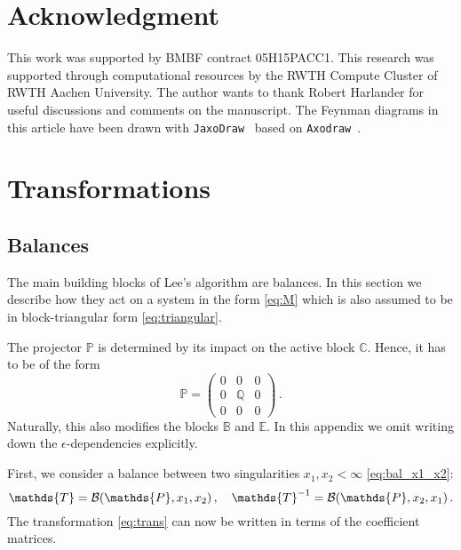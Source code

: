 \documentclass[12pt]{article}
\numberwithin{equation}{section}
\numberwithin{figure}{section}
\newcommand{\B}{\mathds{B}}
\newcommand{\C}{\mathds{C}}
\newcommand{\E}{\mathds{E}}
\newcommand{\T}{\mathds{T}}
\renewcommand{\P}{\mathds{P}}
\newcommand{\Q}{\mathds{Q}}
\begin{document}
  \section*{Acknowledgment}
    This work was supported by BMBF contract 05H15PACC1.
    This research was supported through computational resources by the RWTH Compute Cluster of RWTH Aachen University.
    The author wants to thank Robert Harlander for useful discussions and comments on the manuscript.
    The Feynman diagrams in this article have been drawn with \texttt{JaxoDraw}~\cite{Binosi:2008ig} based on \texttt{Axodraw}~\cite{Vermaseren:1994je}.
  \appendix
  \section{Transformations} \label{sect:app_bal}
    \subsection{Balances}
      The main building blocks of Lee's algorithm are balances.
      In this section we describe how they act on a system in the form \eqref{eq:M} which is also assumed to be in block-triangular form \eqref{eq:triangular}.

      The projector $\P$ is determined by its impact on the active block $\C$.
      Hence, it has to be of the form
      \[
        \P = \begin{pmatrix}
          0 & 0 & 0 \\
          0 & \Q & 0 \\
          0 & 0 & 0
        \end{pmatrix}\,.
      \]        
      Naturally, this also modifies the blocks $\B$ and $\E$.
      In this appendix we omit writing down the $\epsilon$-dependencies explicitly.

      First, we consider a balance between two singularities $x_1, x_2 < \infty$ \eqref{eq:bal_x1_x2}:
      \[
        \T = {\cal B}(\P,x_1,x_2)\,, \quad
        \T^{-1} = {\cal B}(\P,x_2,x_1)\,.
      \]
      The transformation \eqref{eq:trans} can now be written in terms of the coefficient matrices.
\end{document}
